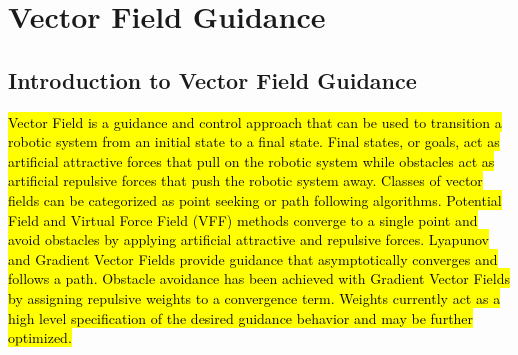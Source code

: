 \documentclass[numbered,pdftex]{ohio-etd}
\begin{document}
%
%
%


\section{Vector Field Guidance}
\subsection{Introduction to Vector Field Guidance}
 \hl{Vector Field is a guidance and control approach that can be used to transition a robotic system from an initial state to a final state. Final states, or goals, act as artificial attractive forces that pull on the robotic system while obstacles act as artificial repulsive forces that push the robotic system away. Classes of vector fields can be categorized as point seeking or path following algorithms. Potential Field and Virtual Force Field (VFF) methods converge to a single point and avoid obstacles by applying artificial attractive and repulsive forces. Lyapunov and Gradient Vector Fields provide guidance that asymptotically converges and follows a path. Obstacle avoidance has been achieved with Gradient Vector Fields by assigning repulsive weights to a convergence term. Weights currently act as a high level specification of the desired guidance behavior and may be further optimized.} 
\end{document}
